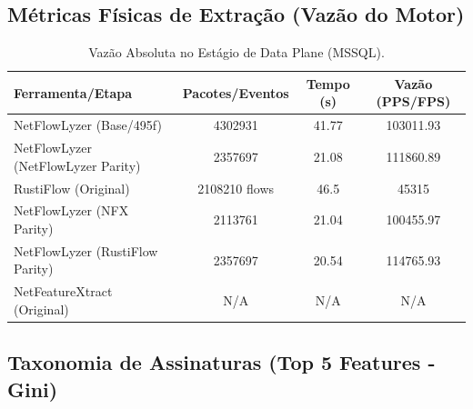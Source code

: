 \documentclass[11pt,a4paper]{article}
\begin{document}
\subsection{Métricas Físicas de Extração (Vazão do Motor)}
\begin{table}[H]
\centering
\begin{threeparttable}
\begin{tabular}{lccc}
\toprule
\textbf{Ferramenta/Etapa} & \textbf{Pacotes/Eventos} & \textbf{Tempo (s)} & \textbf{Vazão (PPS/FPS)} \\
\midrule
NetFlowLyzer (Base/495f) & 4302931 & 41.77 & 103011.93 \\
NetFlowLyzer (NetFlowLyzer Parity) & 2357697 & 21.08 & 111860.89 \\
RustiFlow (Original) & 2108210 flows & 46.5 & 45315 \\
NetFlowLyzer (NFX Parity) & 2113761 & 21.04 & 100455.97 \\
NetFlowLyzer (RustiFlow Parity) & 2357697 & 20.54 & 114765.93 \\
NetFeatureXtract (Original) & N/A & N/A & N/A \\
\bottomrule
\end{tabular}
\end{threeparttable}
\caption{Vazão Absoluta no Estágio de Data Plane (MSSQL).}
\end{table}

\subsection{Taxonomia de Assinaturas (Top 5 Features - Gini)}
\begin{table}[H]
\centering
{}
\caption{Principais atributos de correlação estocástica por limiar dimensional (MSSQL).}
\end{table}
\end{document}
